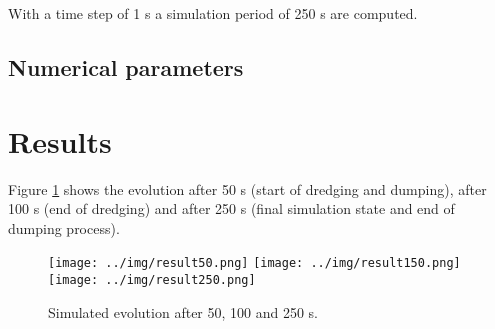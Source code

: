 With a time step of 1 s a simulation period of 250 s are computed.
%
%
\subsection{Numerical parameters}
%
%
%
\section{Results}
%
Figure \ref{result50} shows the evolution after 50 s (start of dredging and dumping),
after 100 s (end of dredging) and after 250 s (final simulation state and end of dumping process).

\begin{figure} [!h]
\centering
\texttt{[image: ../img/result50.png]}
\texttt{[image: ../img/result150.png]}
\texttt{[image: ../img/result250.png]}
 \caption{Simulated evolution after 50, 100 and 250 s.}\label{result50}
\end{figure}


